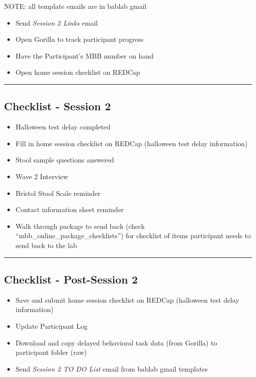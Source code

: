 \documentclass[]{book}
\providecommand{\tightlist}{%
  \setlength{\itemsep}{0pt}\setlength{\parskip}{0pt}}
\begin{document}
NOTE: all template emails are in bablab gmail

\begin{itemize}
\tightlist
\item
  Send \emph{Session 2 Links} email
\item
  Open Gorilla to track participant progress
\item
  Have the Participant's MBB number on hand
\item
  Open home session checklist on REDCap
\end{itemize}

\begin{center}\rule{0.5\linewidth}{0.5pt}\end{center}

\hypertarget{checklist---session-2}{%
\subsection{Checklist - Session 2}\label{checklist---session-2}}

\begin{itemize}
\tightlist
\item
  Halloween test delay completed
\item
  Fill in home session checklist on REDCap (halloween test delay information)
\item
  Stool sample questions answered
\item
  Wave 2 Interview
\item
  Bristol Stool Scale reminder
\item
  Contact information sheet reminder
\item
  Walk through package to send back (check ``mbb\_online\_package\_checklists'') for checklist of items participant needs to send back to the lab
\end{itemize}

\begin{center}\rule{0.5\linewidth}{0.5pt}\end{center}

\hypertarget{checklist---post-session-2}{%
\subsection{Checklist - Post-Session 2}\label{checklist---post-session-2}}

\begin{itemize}
\tightlist
\item
  Save and submit home session checklist on REDCap (halloween test delay information)
\item
  Update Participant Log
\item
  Download and copy delayed behavioral task data (from Gorilla) to participant folder (raw)
\item
  Send \emph{Session 2 TO DO List} email from bablab gmail templates
\end{itemize}
\end{document}
